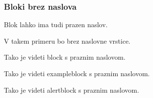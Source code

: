 \documentclass{beamer}
\begin{document}

\begin{frame}
   \frametitle{Bloki brez naslova}

   Blok lahko ima tudi prazen naslov.
   
   V takem primeru bo brez naslovne vrstice.
   \begin{block}{}
      Tako je videti block s praznim naslovom.
   \end{block}
   \begin{exampleblock}{}
      Tako je videti exampleblock s praznim naslovom.
   \end{exampleblock}
   \begin{alertblock}{}
      Tako je videti alertblock s praznim naslovom.
   \end{alertblock}
\end{frame}

\end{document}
